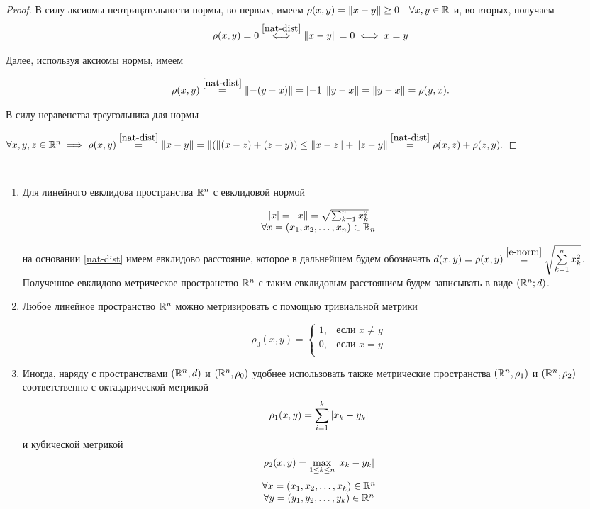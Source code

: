 \documentclass[../../main.tex]{subfiles}
\begin{document}
\begin{proof}
 В силу аксиомы неотрицательности нормы, во-первых, имеем $\rho(x, y) 
 = \lVert{x-y}\rVert \ge 0 \quad \forall x, y \in \mathbb{R}$ и, во-вторых, получаем
 \[\rho(x, y) = 0 \stackrel{\eqref{nat-dist}}{\iff} \lVert{x-y}\rVert = 0 
  \iff x = y\]
 
 Далее, используя аксиомы нормы, имеем
 
 \[\rho(x, y) \stackrel{\eqref{nat-dist}}{=} \lVert{-(y-x)}\rVert =
   \left|{-1}\right|\lVert{y-x}\rVert = \lVert{y-x}\rVert = \rho(y, x).\]
 
 В силу неравенства треугольника для нормы
 
 $\forall x, y, z \in \R^n \implies \rho(x, y) \stk{nat-dist}{=} 
  \norm{x-y} = \norm((x-z) + (z-y)) \le
  \norm{x-z} + \norm{z-y} \stk{nat-dist}{=} \rho(x, z) +  \rho(z, y).$
\end{proof}

\begin{rem} 

 \

 \begin{enumerate}
  \item  Для линейного евклидова пространства $\mathbb{R}^n$ с евклидовой
  нормой
  
  \begin{equation}
   \label{e-norm}
   \begin{array}{c}
    \left|{x}\right| = \lVert{x}\rVert = \sqrt{\sum_{k=1}^n x_k^2} \\
    \forall x = (x_1, x_2, \dots, x_n) \in \mathbb{R}_n
   \end{array}
  \end{equation}
  
  на основании \eqref{nat-dist} имеем евклидово расстояние, которое
  в дальнейшем будем обозначать $d(x, y) = \rho(x, y) \stk{e-norm}{=}
  \sqrt{\sum\limits_{k=1}^n x_k^2}$. Полученное евклидово метрическое
  пространство $\mathbb{R}^n$ с таким евклидовым расстоянием будем записывать
  в виде $(\mathbb{R}^n; d)$.
  
  \item Любое линейное пространство $\mathbb{R}^n$ можно метризировать с
  помощью тривиальной метрики
  
  \[
   \rho_0(x, y) =
   \begin{cases}
    1, & \text{если } x \ne y \\
    0, & \text{если } x = y \\
   \end{cases}
  \]
  
  \item Иногда, наряду с пространствами $(\mathbb{R}^n, d)$ и $(\mathbb{R}^n, \rho_0)$
  удобнее использовать также метрические пространства $(\mathbb{R}^n, \rho_1)$
  и $(\mathbb{R}^n, \rho_2)$ соответственно с октаэдрической метрикой
  \[\rho_1(x, y) = \sum_{i=1}^k \left|{x_k - y_k}\right|\]
  и кубической метрикой
  \[\rho_2(x, y) = \max_{1 \le k \le n} \left|{x_k - y_k}\right|\]
  \[\begin{array}{c}
     \forall x = (x_1, x_2, \dots, x_k) \in \mathbb{R}^n \\
     \forall y = (y_1, y_2, \dots, y_k) \in \mathbb{R}^n \\
    \end{array}\]
 \end{enumerate}

\end{rem}
\end{document}
